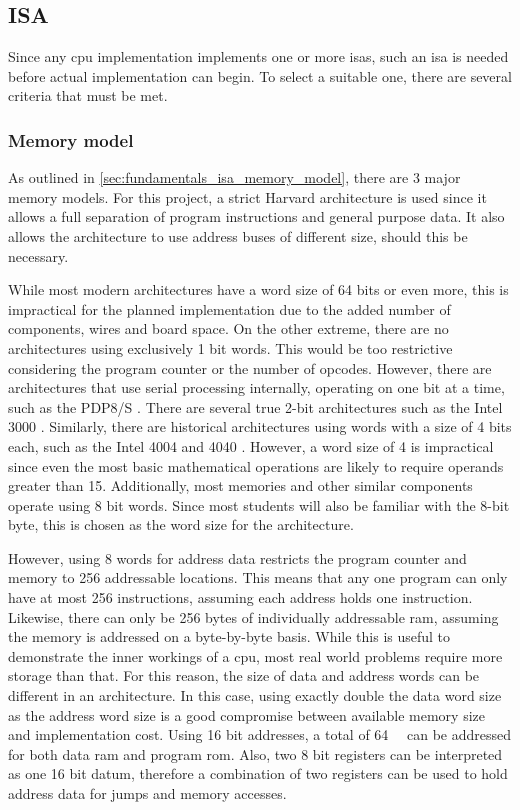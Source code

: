 \subsection{ISA} \label{sec:design_isa}

Since any \ac{cpu} implementation implements one or more \acp{isa}, such an \ac{isa} is needed before actual implementation can begin. To select a suitable one, there are several criteria that must be met. 

\subsubsection{Memory model}

As outlined in \autoref{sec:fundamentals_isa_memory_model}, there are 3 major memory models. For this project, a strict Harvard architecture is used since it allows a full separation of program instructions and general purpose data. It also allows the architecture to use address buses of different size, should this be necessary.

While most modern architectures have a word size of 64 bits or even more, this is impractical for the planned implementation due to the added number of components, wires and board space. On the other extreme, there are no architectures using exclusively 1 bit words. This would be too restrictive considering the program counter or the number of opcodes. However, there are architectures that use serial processing internally, operating on one bit at a time, such as the PDP8/S \cite{computermuseum_pdp8s}. There are several true 2-bit architectures such as the Intel 3000 \cite{wikichip_intel3000}. Similarly, there are historical architectures using words with a size of 4 bits each, such as the Intel 4004 and 4040 \cite{intel4004history}. However, a word size of 4 is impractical since even the most basic mathematical operations are likely to require operands greater than 15. Additionally, most memories and other similar components operate using 8 bit words. Since most students will also be familiar with the 8-bit byte, this is chosen as the word size for the architecture.

However, using 8 words for address data restricts the program counter and memory to 256 addressable locations. This means that any one program can only have at most 256 instructions, assuming each address holds one instruction. Likewise, there can only be 256 bytes of individually addressable \ac{ram}, assuming the memory is addressed on a byte-by-byte basis. While this is useful to demonstrate the inner workings of a \ac{cpu}, most real world problems require more storage than that. For this reason, the size of data and address words can be different in an architecture. In this case, using exactly double the data word size as the address word size is a good compromise between available memory size and implementation cost. Using 16 bit addresses, a total of \SI{64}{\kibi\byte} can be addressed for both data \ac{ram} and program \ac{rom}. Also, two 8 bit registers can be interpreted as one 16 bit datum, therefore a combination of two registers can be used to hold address data for jumps and memory accesses.


